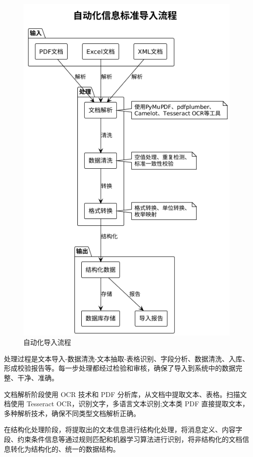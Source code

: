 \begin{figure}[H]
    \centering
    \includegraphics[height=0.5\textheight,keepaspectratio]{chapters/fig-0/import_pipeline_simple.png}
    \caption{自动化导入流程}
    \label{fig:import_pipeline}
\end{figure}

处理过程是文本导入-数据清洗-文本抽取-表格识别、字段分析、数据清洗、入库、形成校验报告等。每一步处理都经过检验和审核，确保了导入到系统中的数据完整、干净、准确。

文档解析阶段使用 OCR 技术和 PDF 分析库，从文档中提取文本、表格。扫描文档使用 Tesseract OCR，识别文字，多语言文本识别;文本类 PDF 直接提取文本，多种解析技术，确保不同类型文档解析正确。

在结构化处理阶段，将提取出的文本信息进行结构化处理，将消息定义、内容字段、约束条件信息等通过规则匹配和机器学习算法进行识别，将非结构化的文档信息转化为结构化的、统一的数据结构。

